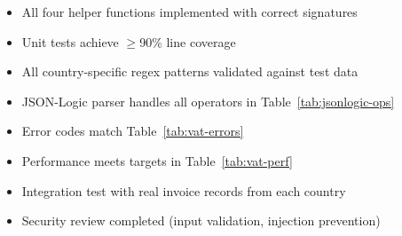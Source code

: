 \begin{itemize}
  \item[\texttt{[ ]}] All four helper functions implemented with correct signatures
  \item[\texttt{[ ]}] Unit tests achieve $\geq$90\% line coverage
  \item[\texttt{[ ]}] All country-specific regex patterns validated against test data
  \item[\texttt{[ ]}] JSON-Logic parser handles all operators in Table~\ref{tab:jsonlogic-ops}
  \item[\texttt{[ ]}] Error codes match Table~\ref{tab:vat-errors}
  \item[\texttt{[ ]}] Performance meets targets in Table~\ref{tab:vat-perf}
  \item[\texttt{[ ]}] Integration test with real invoice records from each country
  \item[\texttt{[ ]}] Security review completed (input validation, injection prevention)
\end{itemize}
